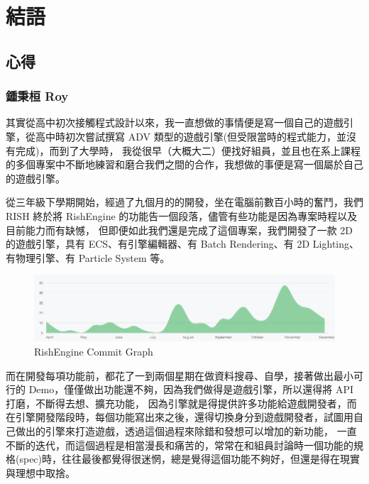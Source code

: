 \chapter{結語}

\section{心得}

\subsection{鍾秉桓 Roy}
\label{sec:Roy}

其實從高中初次接觸程式設計以來，我一直想做的事情便是寫一個自己的遊戲引擎，從高中時初次嘗試撰寫 ADV 類型的遊戲引擎(但受限當時的程式能力，並沒有完成)，而到了大學時，
我從很早（大概大二）便找好組員，並且也在系上課程的多個專案中不斷地練習和磨合我們之間的合作，我想做的事便是寫一個屬於自己的遊戲引擎。

從三年級下學期開始，經過了九個月的的開發，坐在電腦前數百小時的奮鬥，我們 RISH 終於將 RishEngine 的功能告一個段落，儘管有些功能是因為專案時程以及目前能力而有缺憾，
但即便如此我們還是完成了這個專案，我們開發了一款 2D 的遊戲引擎，具有 ECS、有引擎編輯器、有 Batch Rendering、有 2D Lighting、有物理引擎、有 Particle System 等。

\begin{figure}[h]
    \begin{center}
    \includegraphics[width=\textwidth]{./resources/ch6/commit.png}
    \end{center}
\caption*{RishEngine Commit Graph}
\end{figure}

而在開發每項功能前，都花了一到兩個星期在做資料搜尋、自學，接著做出最小可行的 Demo，僅僅做出功能還不夠，因為我們做得是遊戲引擎，所以還得將 API 打磨，不斷得去想、擴充功能，
因為引擎就是得提供許多功能給遊戲開發者，而在引擎開發階段時，每個功能寫出來之後，還得切換身分到遊戲開發者，試圖用自己做出的引擎來打造遊戲，透過這個過程來除錯和發想可以增加的新功能，
一直不斷的迭代，而這個過程是相當漫長和痛苦的，常常在和組員討論時一個功能的規格(spec)時，往往最後都覺得很迷惘，總是覺得這個功能不夠好，但還是得在現實與理想中取捨。

